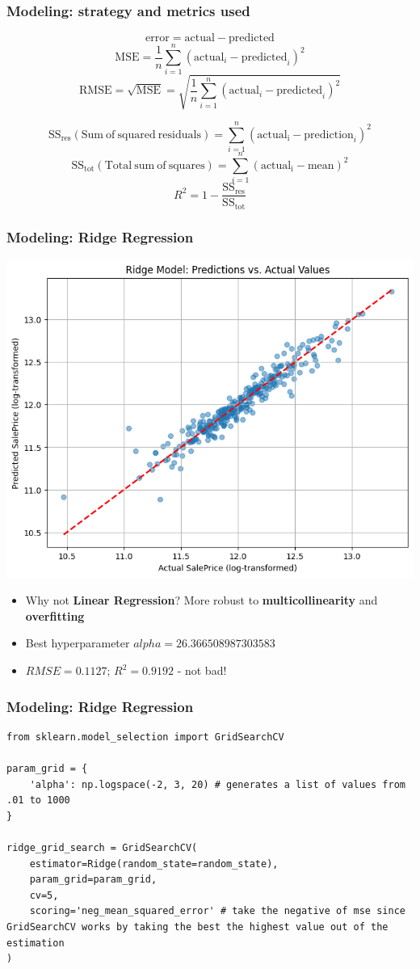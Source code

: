 \documentclass{beamer}
\begin{document}
\begin{frame}
\frametitle{Modeling: strategy and metrics used}

\footnotesize
$$\mathrm{error}=\mathrm{actual}-\mathrm{predicted}$$
$$\mathrm{MSE}=\frac{1}{n}\sum_{i=1}^{n}(\mathrm{actual}_i-\mathrm{predicted}_i)^2$$
$$\mathrm{RMSE}=\sqrt{\mathrm{MSE}}=\sqrt{\frac{1}{n}\sum_{i=1}^{n}(\mathrm{actual}_i-\mathrm{predicted}_i)^2}$$

$$\mathrm{SS}_{\mathrm{res}}(\mathrm{Sum\ of\ squared\ residuals})=\sum_{i=1}^n(\mathrm{actual_i}-\mathrm{prediction}_i)^2$$
$$\mathrm{SS}_{\mathrm{tot}}(\mathrm{Total\ sum\ of\ squares})=\sum_{i=1}^n(\mathrm{actual_i}-\mathrm{mean})^2$$
$$R^2=1-\frac{\mathrm{SS}_{\mathrm{res}}}{\mathrm{SS}_{\mathrm{tot}}}$$
\normalsize
\end{frame}

\begin{frame}
\frametitle{Modeling: Ridge Regression}
\centering
    \includegraphics[width=.7\textwidth]{../challenge/main_files/main_45_0.png}

\begin{itemize}
    \item Why not \textbf{Linear Regression}? More robust to \textbf{multicollinearity} and \textbf{overfitting}
    \item Best hyperparameter $alpha=26.366508987303583$
    \item $RMSE = 0.1127$; $R^2 = 0.9192$ - not bad!
\end{itemize}
\end{frame}

\begin{frame}[fragile]
\frametitle{Modeling: Ridge Regression}

\begin{verbatim}
from sklearn.model_selection import GridSearchCV

param_grid = {
    'alpha': np.logspace(-2, 3, 20) # generates a list of values from .01 to 1000
}

ridge_grid_search = GridSearchCV(
    estimator=Ridge(random_state=random_state),
    param_grid=param_grid,
    cv=5,
    scoring='neg_mean_squared_error' # take the negative of mse since GridSearchCV works by taking the best the highest value out of the estimation
)
\end{verbatim}
\end{frame}
\end{document}
